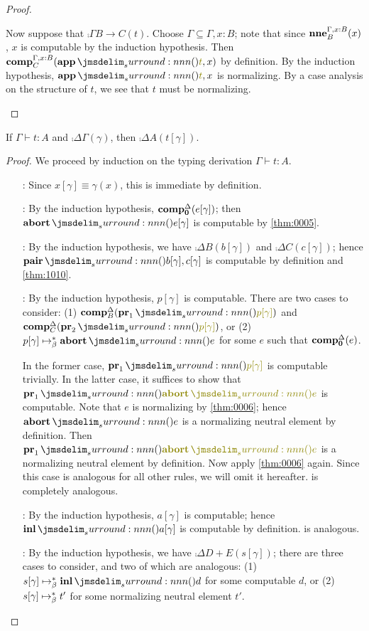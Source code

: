 \documentclass[a4paper]{article}
\begin{document}
\begin{proof}
\begin{itemize}
    Now suppose that $\comp{\Gamma}{B \to C}(t)$.
    Choose $\Gamma \subseteq \Gamma,x : B$; note that since $\operatorname{\mathbf{nne}}^{\Gamma,x : B}_{B}(x)$, $x$ is computable by the induction hypothesis.
    Then $\comp{\Gamma,x : B}{C}(\tmApp{t}{x})$ by definition.
    By the induction hypothesis, $\tmApp{t}{x}$ is normalizing.
    By a case analysis on the structure of $t$, we see that $t$ must be normalizing.
  \end{itemize}
\end{proof}

\begin{theorem}[\cref{ax:0001}]\label{thm:0302}
  If $\Gamma \vdash t : A$ and $\comp{\Delta}{\Gamma}(\gamma)$, then $\comp{\Delta}{A}(t[\gamma])$.
\end{theorem}
\begin{proof}
  We proceed by induction on the typing derivation $\Gamma \vdash t : A$.
  \begin{itemize}
  \item[\rVar:] Since $x[\gamma] \equiv \gamma(x)$, this is immediate by definition.
  \item[\rEmpE:] By the induction hypothesis, $\operatorname{\mathbf{comp}}^{\Delta}_{\mathbf{0}}(e[\gamma])$; then $\tmAbort{e[\gamma]}$ is computable by \cref{thm:0005}.
  \item[\rProdI:] By the induction hypothesis, we have $\comp{\Delta}{B}(b[\gamma])$ and $\comp{\Delta}{C}(c[\gamma])$; hence $\tmPair{b[\gamma]}{c[\gamma]}$ is computable by definition and \cref{thm:1010}.
  \item[\rProdEl:] By the induction hypothesis, $p[\gamma]$ is computable.
    There are two cases to consider: (1) $\comp{\Delta}{B}(\tmPrl{p[\gamma]})$ and $\comp{\Delta}{C}(\tmPrr{p[\gamma]})$, or (2) $p[\gamma] \bRed* \tmAbort{e}$ for some $e$ such that $\operatorname{\mathbf{comp}}^{\Delta}_{\mathbf{0}}(e)$.

    In the former case, $\tmPrl{p[\gamma]}$ is computable trivially.
    In the latter case, it suffices to show that $\tmPrl{\tmAbort{e}}$ is computable.
    Note that $e$ is normalizing by \cref{thm:0006}; hence $\tmAbort{e}$ is a normalizing neutral element by definition.
    Then $\tmPrl{\tmAbort{e}}$ is a normalizing neutral element by definition.
    Now apply \cref{thm:0006} again.
    Since this case is analogous for all other rules, we will omit it hereafter.
    \rProdEr{} is completely analogous.
  \item[\rSumIl:] By the induction hypothesis, $a[\gamma]$ is computable; hence $\tmInl{a[\gamma]}$ is computable by definition.
    \rSumIr{} is analogous.
  \item[\rSumE:] By the induction hypothesis, we have $\comp{\Delta}{D + E}(s[\gamma])$; there are three cases to consider, and two of which are analogous: (1) $s[\gamma] \bRed* \tmInl{d}$ for some computable $d$, or (2) $s[\gamma] \bRed* t'$ for some normalizing neutral element $t'$.


\end{itemize}
\end{proof}
\end{document}
